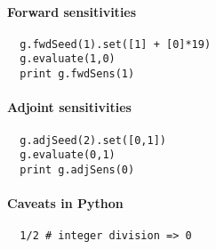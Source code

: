 \documentclass[a4paper,8pt,twocolumn]{article}
\begin{document}
\paragraph{Forward sensitivities}

\begin{verbatim}
  g.fwdSeed(1).set([1] + [0]*19)
  g.evaluate(1,0)
  print g.fwdSens(1)
\end{verbatim}

\paragraph{Adjoint sensitivities}

\begin{verbatim}
  g.adjSeed(2).set([0,1])
  g.evaluate(0,1)
  print g.adjSens(0)
\end{verbatim}

\paragraph{Caveats in Python}
\begin{verbatim}
  1/2 # integer division => 0
\end{verbatim}
\end{document}
